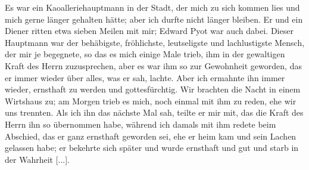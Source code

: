 Es war ein Kaoalleriehauptmann in der Stadt, der mich zu sich
kommen lies und mich gerne länger gehalten hätte; aber ich
durfte nicht länger bleiben. Er und ein Diener ritten etwa
sieben Meilen mit mir; Edward Pyot war 
auch dabei. Dieser
Hauptmann war der behäbigste, fröhlichste, leutseligste und 
lachlustigste Mensch, der mir je 
begegnete, so das es mich einige Male
trieb, ihm in der gewaltigen Kraft des Herrn zuzusprechen, aber
es war ihm so zur Gewohnheit geworden, das er immer wieder
über alles, was er sah, lachte. Aber ich ermahnte ihn immer
wieder, ernsthaft zu werden und gottesfürchtig. Wir brachten die
Nacht in einem Wirtshaus zu; am Morgen trieb es mich, noch
einmal mit ihm zu reden, ehe wir uns trennten. Als ich ihn
das nächste Mal sah, teilte er mir mit, das die Kraft des Herrn
ihn so übernommen habe, während ich damals mit ihm redete
beim Abschied, das er ganz ernsthaft geworden sei, ehe er heim
kam und sein Lachen gelassen habe; er bekehrte sich später und
wurde ernsthaft und gut und starb in der Wahrheit [...].



